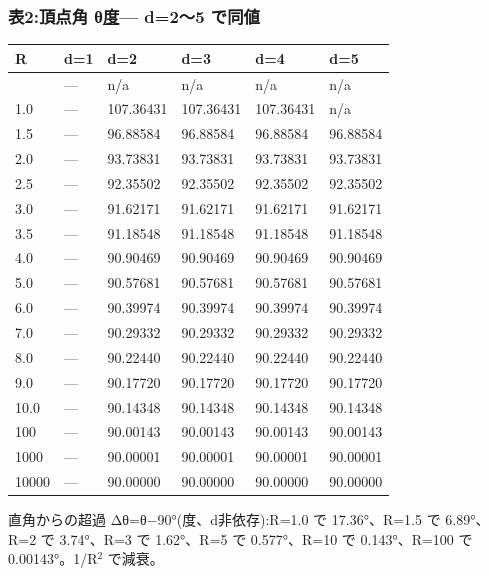 \documentclass[
]{ltjsarticle}
\newcounter{none} %
\begin{document}
\subsubsection{\texorpdfstring{表2:頂点角 θ\href{直角=90°の歪み}{度}---
d=2〜5
で同値}{表2:頂点角 θ度--- d=2〜5 で同値}}\label{ux88682ux9802ux70b9ux89d2-ux3b8ux5ea6-d25-ux3067ux540cux5024}

{\def\LTcaptype{none} %
\begin{longtable}[]{@{}llllll@{}}
\toprule\noalign{}
R & d=1 & d=2 & d=3 & d=4 & d=5 \\
\midrule\noalign{}
\endhead
\bottomrule\noalign{}
\endlastfoot
0.5 & --- & n/a & n/a & n/a & n/a \\
1.0 & --- & 107.36431 & 107.36431 & 107.36431 & n/a \\
1.5 & --- & 96.88584 & 96.88584 & 96.88584 & 96.88584 \\
2.0 & --- & 93.73831 & 93.73831 & 93.73831 & 93.73831 \\
2.5 & --- & 92.35502 & 92.35502 & 92.35502 & 92.35502 \\
3.0 & --- & 91.62171 & 91.62171 & 91.62171 & 91.62171 \\
3.5 & --- & 91.18548 & 91.18548 & 91.18548 & 91.18548 \\
4.0 & --- & 90.90469 & 90.90469 & 90.90469 & 90.90469 \\
5.0 & --- & 90.57681 & 90.57681 & 90.57681 & 90.57681 \\
6.0 & --- & 90.39974 & 90.39974 & 90.39974 & 90.39974 \\
7.0 & --- & 90.29332 & 90.29332 & 90.29332 & 90.29332 \\
8.0 & --- & 90.22440 & 90.22440 & 90.22440 & 90.22440 \\
9.0 & --- & 90.17720 & 90.17720 & 90.17720 & 90.17720 \\
10.0 & --- & 90.14348 & 90.14348 & 90.14348 & 90.14348 \\
100 & --- & 90.00143 & 90.00143 & 90.00143 & 90.00143 \\
1000 & --- & 90.00001 & 90.00001 & 90.00001 & 90.00001 \\
10000 & --- & 90.00000 & 90.00000 & 90.00000 & 90.00000 \\
\end{longtable}
}

直角からの超過 Δθ=θ−90°(度、d非依存):R=1.0 で 17.36°、R=1.5 で
6.89°、R=2 で 3.74°、R=3 で 1.62°、R=5 で 0.577°、R=10 で 0.143°、R=100
で 0.00143°。1/R\(^{2}\) で減衰。
\end{document}
